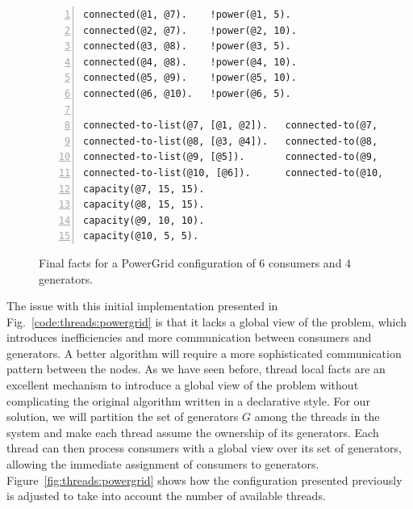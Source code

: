 \begin{figure}[h!]
\begin{Verbatim}[numbers=left,fontsize=\codesize,commandchars=*\#\&]
connected(@1, @7).    !power(@1, 5).
connected(@2, @7).    !power(@2, 10).
connected(@3, @8).    !power(@3, 5).
connected(@4, @8).    !power(@4, 10).
connected(@5, @9).    !power(@5, 10).
connected(@6, @10).   !power(@6, 5).

connected-to-list(@7, [@1, @2]).   connected-to(@7, @1, 5).   connected-to(@7, @2, 10).
connected-to-list(@8, [@3, @4]).   connected-to(@8, @3, 5).   connected-to(@8, @4, 10).
connected-to-list(@9, [@5]).       connected-to(@9, @5, 10).
connected-to-list(@10, [@6]).      connected-to(@10, @6, 5).
capacity(@7, 15, 15).
capacity(@8, 15, 15).
capacity(@9, 10, 10).
capacity(@10, 5, 5).
\end{Verbatim}
\caption{Final facts for a PowerGrid configuration of 6 consumers and 4 generators.}
\label{code:threads:powergrid_final}
\end{figure}

The issue with this initial implementation presented in
Fig.~\ref{code:threads:powergrid} is that it lacks a global view of the problem,
which introduces inefficiencies and more communication between consumers and
generators. A better algorithm will require a more sophisticated communication
pattern between the nodes. As we have seen before, thread local facts are an
excellent mechanism to introduce a global view of the problem without
complicating the original algorithm written in a declarative style. For our
solution, we will partition the set of generators $G$ among the threads in the
system and make each thread assume the ownership of its generators. Each thread
can then process consumers with a global view over its set of generators,
allowing the immediate assignment of consumers to generators.
Figure~\ref{fig:threads:powergrid} shows how the configuration presented
previously is adjusted to take into account the number of available threads.

